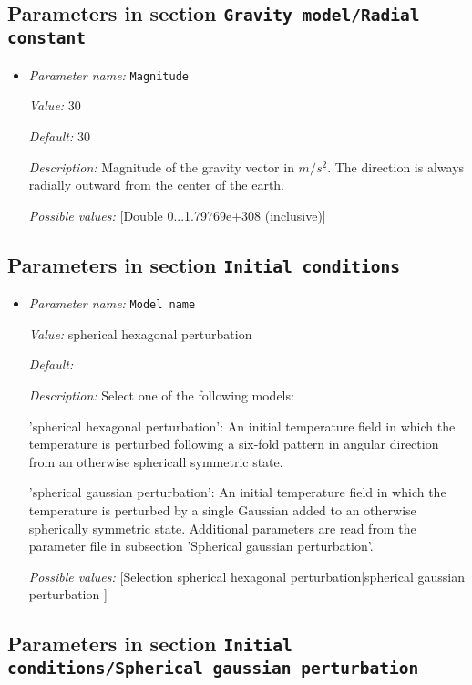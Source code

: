 \subsection{Parameters in section \tt Gravity model/Radial constant}

\begin{itemize}
\item {\it Parameter name:} {\tt Magnitude}


{\it Value:} 30


{\it Default:} 30


{\it Description:} Magnitude of the gravity vector in $m/s^2$. The direction is always radially outward from the center of the earth.


{\it Possible values:} [Double 0...1.79769e+308 (inclusive)]
\end{itemize}

\subsection{Parameters in section \tt Initial conditions}

\begin{itemize}
\item {\it Parameter name:} {\tt Model name}


{\it Value:} spherical hexagonal perturbation


{\it Default:} 


{\it Description:} Select one of the following models:

'spherical hexagonal perturbation': An initial temperature field in which the temperature is perturbed following a six-fold pattern in angular direction from an otherwise sphericall symmetric state.

'spherical gaussian perturbation': An initial temperature field in which the temperature is perturbed by a single Gaussian added to an otherwise spherically symmetric state. Additional parameters are read from the parameter file in subsection 'Spherical gaussian perturbation'.


{\it Possible values:} [Selection spherical hexagonal perturbation|spherical gaussian perturbation ]
\end{itemize}



\subsection{Parameters in section \tt Initial conditions/Spherical gaussian perturbation}

